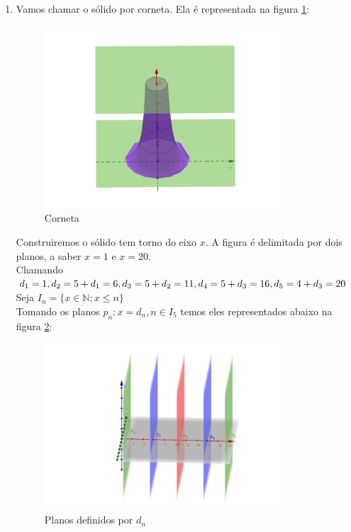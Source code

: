 \documentclass[english,ngerman,parskip=half]{scrartcl}
\begin{document}
\begin{enumerate}
    \item
        Vamos chamar o sólido por corneta. 
        Ela é representada na figura \ref{solido}:

        \begin{figure}[ht!]
            \centering
            \includegraphics[width=90mm]{./images/3d-solido.png}
            \caption{Corneta \label{solido}}
        \end{figure}
        
        Construiremos o sólido tem torno do eixo $x$.
        A figura é delimitada por dois planos, a saber $x = 1$ e $x = 20$. \\
        Chamando \\
        $
        d_1 = 1 , \\
        d_2 = 5 + d_1 = 6, \\
        d_3 = 5 + d_2 = 11, \\
        d_4 = 5 + d_3 = 16, \\
        d_5 = 4 + d_3 = 20$ \\
        Seja $I_n = \{x \in \mathbb{N}; x \leq n\}$ \\
        Tomando os planos $p_n: x = d_n, n \in I_5$ temos eles 
        representados abaixo na figura \ref{3d-planos-dn}:

        \begin{figure}[ht!]
            \centering
            \includegraphics[width=90mm]{./images/3d-planos-dn.png}
            \caption{Planos definidos por $d_n$ \label{3d-planos-dn}}
        \end{figure}
    

\end{enumerate}
\end{document}
